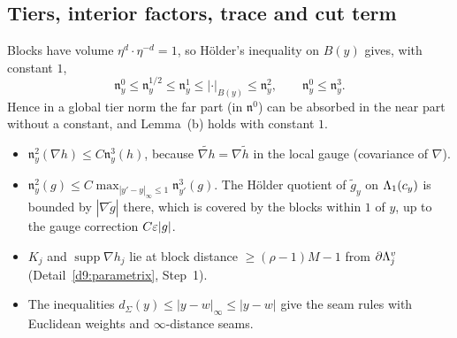 \subsection{Tiers, interior factors, trace and cut term}\label{d9:tiers}

\begin{detail}\label{d9:tier-def}
Blocks have volume $\eta^d\cdot\eta^{-d}=1$, so H\"older's inequality on $B(y)$ gives, with constant $1$,
\[
\mathfrak n^0_y\le\mathfrak n^{1/2}_y\le\mathfrak n^1_y\le|\cdot|_{B(y)}\le\mathfrak n^2_y,\qquad\mathfrak n^0_y\le\mathfrak n^3_y .
\]
Hence in a global tier norm the far part (in $\mathfrak n^0$) can be absorbed in the near part without a constant, and Lemma~(b) holds with constant $1$.
\begin{itemize}
\item $\mathfrak n^2_y(\nabla h)\le C\mathfrak n^3_y(h)$, because $\widetilde{\nabla h}=\nabla\tilde h$ in the local gauge (covariance of $\nabla$).
\item $\mathfrak n^2_y(g)\le C\max_{|y'-y|_\infty\le1}\mathfrak n^3_{y'}(g)$. The H\"older quotient of $\tilde g_y$ on $\Lambda_1(c_y)$ is bounded by $|\nabla\tilde g|$ there, which is covered by the blocks within $1$ of $y$, up to the gauge correction $C\varepsilon|g|$.
\item $K_j$ and $\operatorname{supp}\nabla h_j$ lie at block distance $\ge(\rho-1)M-1$ from $\partial\Lambda^v_j$ (Detail~\ref{d9:parametrix}, Step~1).
\item The inequalities $d_\Sigma(y)\le|y-w|_\infty\le|y-w|$ give the seam rules with Euclidean weights and $\infty$-distance seams.
\end{itemize}
\end{detail}

